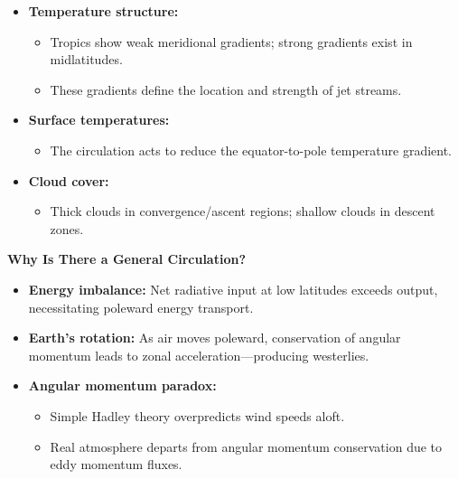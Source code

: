 \documentclass[fontsize=8pt, a4paper, landscape, fleqn]{scrartcl}
\renewcommand{\subsection}[1]{%
    \noindent\colorbox{subsectioncolor}{%
        \parbox{\dimexpr\columnwidth-2\fboxsep}{\color{white}\textbf{#1}}}%
    \vspace{0.5mm}%
}
\begin{document}
\begin{multicols*}{3}[\raggedcolumns]
\begin{itemize}
    \item \textbf{Temperature structure:} 
    \begin{itemize}
        \item Tropics show weak meridional gradients; strong gradients exist in midlatitudes.
        \item These gradients define the location and strength of jet streams.
    \end{itemize}
    \item \textbf{Surface temperatures:}
    \begin{itemize}
        \item The circulation acts to reduce the equator-to-pole temperature gradient.
    \end{itemize}
    \item \textbf{Cloud cover:}
    \begin{itemize}
        \item Thick clouds in convergence/ascent regions; shallow clouds in descent zones.
    \end{itemize}
\end{itemize}

\subsection{Why Is There a General Circulation?}
\begin{itemize}
    \item \textbf{Energy imbalance:} Net radiative input at low latitudes exceeds output, necessitating poleward energy transport.
    \item \textbf{Earth's rotation:} As air moves poleward, conservation of angular momentum leads to zonal acceleration—producing westerlies.
    \item \textbf{Angular momentum paradox:}
    \begin{itemize}
        \item Simple Hadley theory overpredicts wind speeds aloft.
        \item Real atmosphere departs from angular momentum conservation due to eddy momentum fluxes.
    \end{itemize}
\end{itemize}


\end{multicols*}
\end{document}
